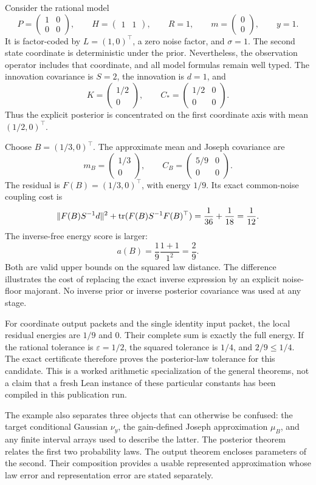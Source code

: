 Consider the rational model
\[
 P=\begin{pmatrix}1&0\\0&0\end{pmatrix},\qquad
 H=\begin{pmatrix}1&1\end{pmatrix},\qquad
 R=1,\qquad m=\begin{pmatrix}0\\0\end{pmatrix},\qquad y=1.
\]
It is factor-coded by $L=(1,0)^\top$, a zero noise factor, and $\sigma=1$. The second state coordinate is deterministic under the prior. Nevertheless, the observation operator includes that coordinate, and all model formulas remain well typed. The innovation covariance is $S=2$, the innovation is $d=1$, and
\[
 K=\begin{pmatrix}1/2\\0\end{pmatrix},\qquad
 C_*=\begin{pmatrix}1/2&0\\0&0\end{pmatrix}.
\]
Thus the explicit posterior is concentrated on the first coordinate axis with mean $(1/2,0)^\top$.

Choose $B=(1/3,0)^\top$. The approximate mean and Joseph covariance are
\[
 m_B=\begin{pmatrix}1/3\\0\end{pmatrix},\qquad
 C_B=\begin{pmatrix}5/9&0\\0&0\end{pmatrix}.
\]
The residual is $F(B)=(1/3,0)^\top$, with energy $1/9$. Its exact common-noise coupling cost is
\[
 \|F(B)S^{-1}d\|^2+\operatorname{tr}(F(B)S^{-1}F(B)^\top)
 =\frac1{36}+\frac1{18}=\frac1{12}.
\]
The inverse-free energy score is larger:
\[
 a(B)=\frac19\frac{1+1}{1^2}=\frac29.
\]
Both are valid upper bounds on the squared law distance. The difference illustrates the cost of replacing the exact inverse expression by an explicit noise-floor majorant. No inverse prior or inverse posterior covariance was used at any stage.

For coordinate output packets and the single identity input packet, the local residual energies are $1/9$ and $0$. Their complete sum is exactly the full energy. If the rational tolerance is $\varepsilon=1/2$, the squared tolerance is $1/4$, and $2/9\le1/4$. The exact certificate therefore proves the posterior-law tolerance for this candidate. This is a worked arithmetic specialization of the general theorems, not a claim that a fresh Lean instance of these particular constants has been compiled in this publication run.

The example also separates three objects that can otherwise be confused: the target conditional Gaussian $\nu_y$, the gain-defined Joseph approximation $\mu_B$, and any finite interval arrays used to describe the latter. The posterior theorem relates the first two probability laws. The output theorem encloses parameters of the second. Their composition provides a usable represented approximation whose law error and representation error are stated separately.
